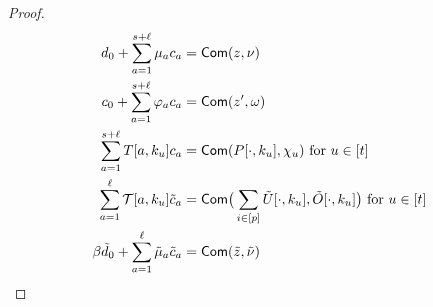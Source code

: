 \begin{proof}
\begin{align}\label{eq:commiteq}
d_0 + \sum_{a=1}^{s+\ell}\mu_ac_a &= \comm(z,\nu) \nonumber \\
c_0 + \sum_{a=1}^{s+\ell}\varphi_ac_a &= \comm(z',\omega) \nonumber \\
\sum_{a=1}^{s+\ell}T[a,k_u]c_a &= \comm(P[\cdot,k_u],\chi_u) \text{ for } u\in [t] \nonumber \\
\sum_{a=1}^{\ell}\mc{T}[a,k_u]\tilde{c}_a &= \comm\big(\sum_{i\in
[p]}\tilde{U}[\cdot,k_u],\tilde{O}[\cdot, k_u]\big) \text{ for } u\in [t] \nonumber \\
\beta\tilde{d}_0 + \sum_{a=1}^{\ell}\tilde{\mu}_a\tilde{c}_a &=
\comm(\tilde{z},\tilde{\nu})
\end{align} 

\end{proof}

